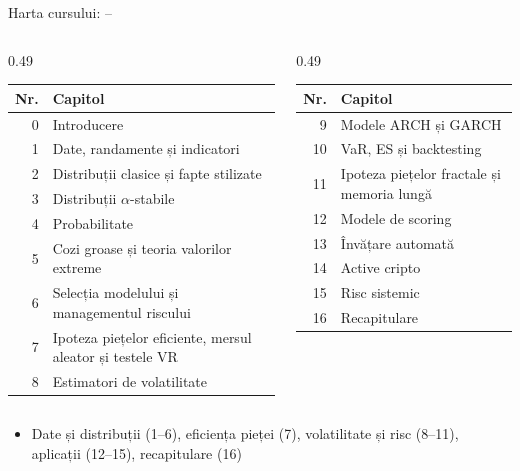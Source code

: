 \begin{frame}{Harta cursului: --}
\itemsize{\footnotesize}
\begin{columns}[T]
\begin{column}{0.49\textwidth}
\begin{center}
\footnotesize
\begin{tabular}{r>{\raggedright\arraybackslash}p{5.6cm}}
\toprule
\textbf{Nr.} & \textbf{Capitol} \\
\midrule
0 & Introducere \\
1 & Date, randamente și indicatori \\
2 & Distribuții clasice și fapte stilizate \\
3 & Distribuții $\alpha$-stabile \\
4 & Probabilitate \\
5 & Cozi groase și teoria valorilor extreme \\
6 & Selecția modelului și managementul riscului \\
7 & Ipoteza piețelor eficiente, mersul aleator și testele VR \\
8 & Estimatori de volatilitate \\
\bottomrule
\end{tabular}
\end{center}

\end{column}
\begin{column}{0.49\textwidth}
\begin{center}
\footnotesize
\begin{tabular}{r>{\raggedright\arraybackslash}p{5.6cm}}
\toprule
\textbf{Nr.} & \textbf{Capitol} \\
\midrule
9 & Modele ARCH și GARCH \\
10 & VaR, ES și backtesting \\
11 & Ipoteza piețelor fractale și memoria lungă \\
12 & Modele de scoring \\
13 & Învățare automată \\
14 & Active cripto \\
15 & Risc sistemic \\
16 & Recapitulare \\
\bottomrule
\end{tabular}
\end{center}

\end{column}
\end{columns}
\begin{itemize}
    \item Date și distribuții (1--6), eficiența pieței (7), volatilitate și risc (8--11), aplicații (12--15), recapitulare (16)
\end{itemize}
\end{frame}

